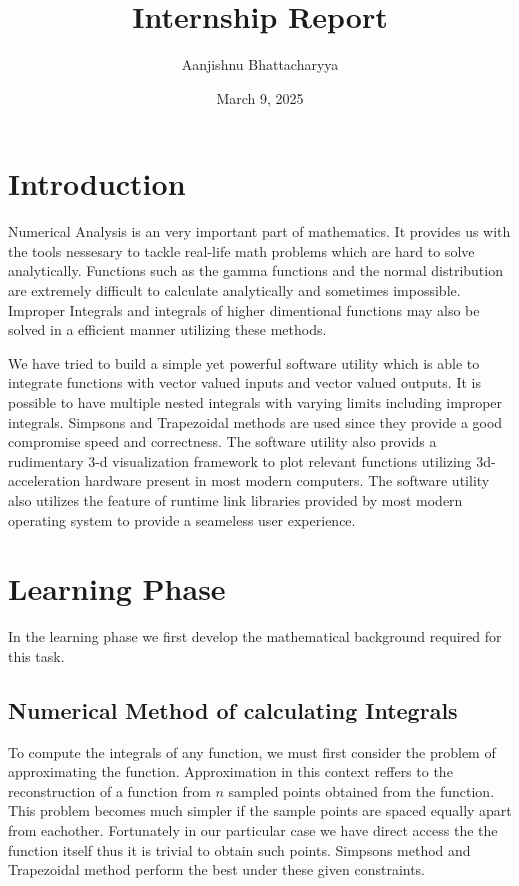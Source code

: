 \documentclass[12pt]{article}
\title{Internship Report}
\date{March 9, 2025}
\author{Aanjishnu Bhattacharyya}
\begin{document}
\maketitle

\section*{Introduction}

Numerical Analysis is an very important part of mathematics. It provides us with the tools nessesary to tackle
real-life math problems which are hard to solve analytically. Functions such as the gamma functions and the normal
distribution are extremely difficult to calculate analytically and sometimes impossible. Improper Integrals and
integrals of higher dimentional functions may also be solved in a efficient manner utilizing these methods.

We have tried to build a simple yet powerful software utility which is able to integrate functions with vector valued
inputs and vector valued outputs. It is possible to have multiple nested integrals with varying limits including improper
integrals. Simpsons and Trapezoidal methods are used since they provide a good compromise speed and correctness.
The software utility also provids a rudimentary 3-d visualization framework to plot relevant functions utilizing 3d-acceleration 
hardware present in most modern computers. The software utility also utilizes the feature of runtime link libraries
provided by most modern operating system to provide a seameless user experience.

\section*{Learning Phase}

In the learning phase we first develop the mathematical background required for this task.

\subsection*{Numerical Method of calculating Integrals}

To compute the integrals of any function, we must first consider the problem of approximating the function.
Approximation in this context reffers to the reconstruction of a function from $n$ sampled points obtained
from the function. This problem becomes much simpler if the sample points are spaced equally apart from eachother.
Fortunately in our particular case we have direct access the the function itself thus it is trivial to obtain such
points. Simpsons method and Trapezoidal method perform the best under these given constraints.
\break
\break
\end{document}
